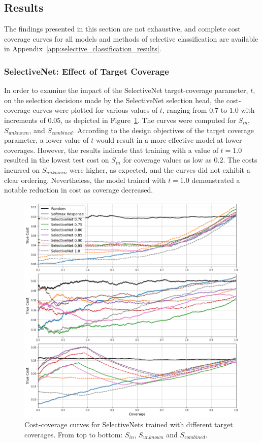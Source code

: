 \subsection{Results}
The findings presented in this section are not exhaustive, and complete cost coverage curves for all models and methods of selective classification are available in Appendix~\ref{app:selective_classification_results}.

\subsubsection{SelectiveNet: Effect of Target Coverage}
In order to examine the impact of the SelectiveNet target-coverage parameter, $t$, on the selection decisions made by the SelectiveNet selection head, the cost-coverage curves were plotted for various values of $t$, ranging from $0.7$ to $1.0$ with increments of $0.05$, as depicted in Figure~\ref{fig:binary-selectivenet}. The curves were computed for $S_{in}$, $S_{unknown}$, and $S_{combined}$. According to the design objectives of the target coverage parameter, a lower value of $t$ would result in a more effective model at lower coverages. However, the results indicate that training with a value of $t=1.0$ resulted in the lowest test cost on $S_{in}$ for coverage values as low as $0.2$. The costs incurred on $S_{unknown}$ were higher, as expected, and the curves did not exhibit a clear ordering. Nevertheless, the model trained with $t=1.0$ demonstrated a notable reduction in cost as coverage decreased.

\begin{figure}[!h]
	\centering
	\includegraphics[width=\textwidth]{images/binary_selectivenet.png}
	\caption{Cost-coverage curves for SelectiveNets trained with different target coverages. From top to bottom: $S_{in}$, $S_{unknown}$ and $S_{combined}$.}
	\label{fig:binary-selectivenet}
\end{figure}


